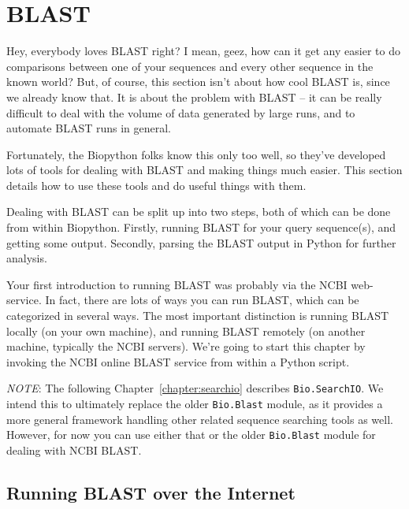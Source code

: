 \chapter{BLAST}
\label{chapter:blast}
Hey, everybody loves BLAST right? I mean, geez, how can it get any easier to do comparisons between one of your sequences and every other sequence in the known world? But, of course, this section isn't about how cool BLAST is, since we already know that. It is about the problem with BLAST -- it can be really difficult to deal with the volume of data generated by large runs, and to automate BLAST runs in general.

Fortunately, the Biopython folks know this only too well, so they've developed lots of tools for dealing with BLAST and making things much easier. This section details how to use these tools and do useful things with them.

Dealing with BLAST can be split up into two steps, both of which can be done from within Biopython.
Firstly, running BLAST for your query sequence(s), and getting some output.
Secondly, parsing the BLAST output in Python for further analysis.

Your first introduction to running BLAST was probably via the NCBI web-service.
In fact, there are lots of ways you can run BLAST, which can be categorized in several ways.
The most important distinction is running BLAST locally (on your own machine),
and running BLAST remotely (on another machine, typically the NCBI servers).
We're going to start this chapter by invoking the NCBI online BLAST service
from within a Python script.

\emph{NOTE}: The following Chapter~\ref{chapter:searchio} describes
\verb|Bio.SearchIO|. We intend this to ultimately replace the older
\verb|Bio.Blast| module, as it provides a more general framework handling
other related sequence searching tools as well. However, for now you can use
either that or the older \verb|Bio.Blast| module for dealing with NCBI BLAST.

\section{Running BLAST over the Internet}
\label{sec:running-www-blast}

